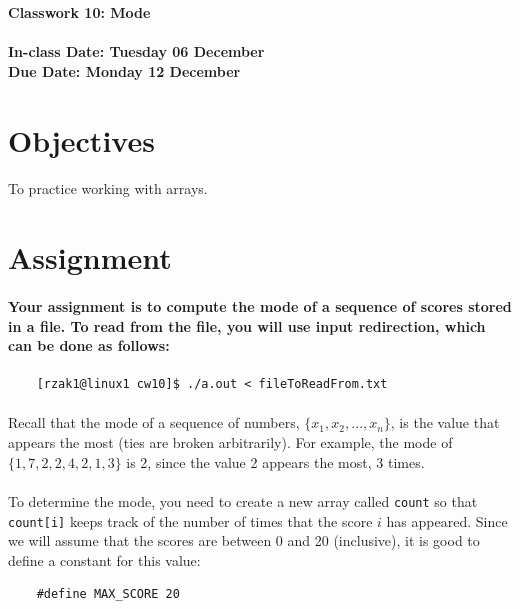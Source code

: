 \documentclass[letter,11pt]{article}
\begin{document}
\huge
\textbf{Classwork 10: Mode}
\normalsize
\\ ~~ \\
\textbf{In-class Date: Tuesday 06 December} \\
\textbf{Due Date: Monday 12 December}

\section*{Objectives}
\paragraph{}To practice working with arrays.

\section*{Assignment}
\paragraph{Your assignment is to compute the mode of a sequence of scores stored in a file. To read from the file, you will use input redirection, which can be done as follows:}
\begin{verbatim}
    [rzak1@linux1 cw10]$ ./a.out < fileToReadFrom.txt
\end{verbatim}

\paragraph{}Recall that the mode of a sequence of numbers, $\{x_1, x_2, \ldots, x_n\}$, is the value that appears the most (ties are broken arbitrarily). For example, the mode of $\{1, 7, 2, 2, 4, 2, 1, 3\}$ is 2, since the value 2 appears the most, 3 times.

\paragraph{}To determine the mode, you need to create a new array called \texttt{count} so that \texttt{count[i]} keeps track of the number of times that the score $i$ has appeared. Since we will assume that the scores are between 0 and 20 (inclusive), it is good to define a constant for this value:
\begin{verbatim}
    #define MAX_SCORE 20
\end{verbatim}
\end{document}

